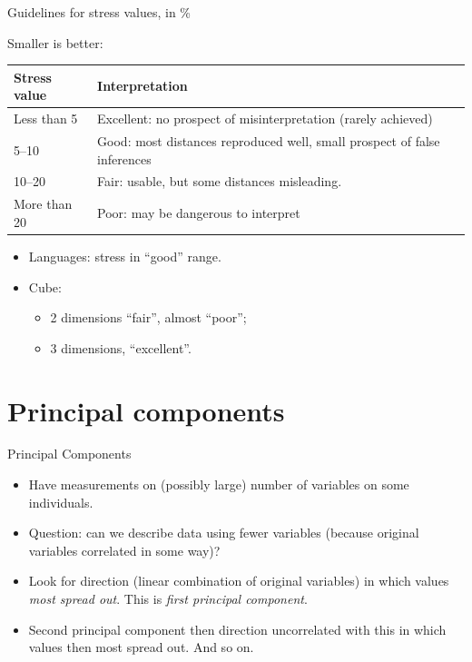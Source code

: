 \documentclass[unknownkeysallowed]{beamer}\usepackage[]{graphicx}\usepackage[]{color}
\begin{document}
\begin{frame}[fragile]{Guidelines for stress values, in \%}

Smaller is better:


\begin{tabular}{lp{3in}}
  Stress value & Interpretation \\
  \hline
  Less than 5 & Excellent: no prospect of misinterpretation (rarely achieved)\\
  5--10 & Good: most distances reproduced well, small prospect of false inferences\\
10--20 & Fair: usable, but some distances misleading.\\
More than 20 & Poor: may be dangerous to interpret\\
\hline
\end{tabular}

\begin{itemize}
\item Languages: stress in ``good'' range.
\item Cube: 
  \begin{itemize}
  \item   2 dimensions ``fair'', almost ``poor'';
  \item 3 dimensions, ``excellent''.
  \end{itemize}
\end{itemize}


\end{frame}

% 

\section{Principal components}
\frame{\sectionpage}

\begin{frame}[fragile]{Principal Components}
  \begin{itemize}
  \item Have measurements on (possibly large) number of variables on some individuals.
  \item Question: can we describe data using fewer variables (because original variables correlated in some way)?
  \item Look for direction (linear combination of original variables) in which values {\em most spread out}. This is {\em first principal component}.
  \item Second principal component then direction uncorrelated with this in which values then most spread out. And so on.
\end{itemize}

\end{frame}
\end{document}
